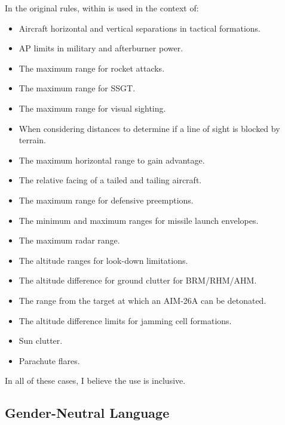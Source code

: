 \documentclass[10pt]{article}
\begin{document}
\begin{itemize}
    In the original rules, within is used in the context of:
    \begin{itemize}
    \item Aircraft horizontal and vertical separations in tactical formations.
    \item AP limits in military and afterburner power.
    \item The maximum range for rocket attacks.
    \item The maximum range for SSGT.
    \item The maximum range for visual sighting.
    \item When considering distances to determine if a line of sight is blocked by terrain.
    \item The maximum horizontal range to gain advantage.
    \item The relative facing of a tailed and tailing aircraft.
    \item The maximum range for defensive preemptions.
    \item The minimum and maximum ranges for missile launch envelopes.
    \item The maximum radar range.
    \item The altitude ranges for look-down limitations.
    \item The altitude difference for ground clutter for BRM/RHM/AHM.
    \item The range from the target at which an AIM-26A can be detonated.
    \item The altitude difference limits for jamming cell formations.
    \item Sun clutter.
    \item Parachute flares.
    \end{itemize}
    In all of these cases, I believe the use is inclusive.

\end{itemize}


\subsection*{Gender-Neutral Language}
 
\end{document}
